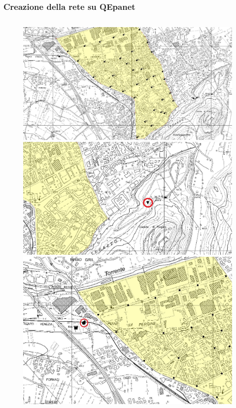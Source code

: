 \documentclass{beamer}
\begin{document}
\begin{frame}
 \frametitle{Creazione della rete su QEpanet}
 
 \begin{columns}
  \begin{column}{.5\textwidth}
   \begin{figure}
    \centering  
    \begin{overprint}
     \includegraphics[width=\linewidth]{images/junctions}
     \includegraphics[width=\linewidth]{images/tanks}
     \includegraphics[width=\linewidth]{images/pump}

\end{overprint}
\end{figure}
\end{column}
\end{columns}
\end{frame}
\end{document}
